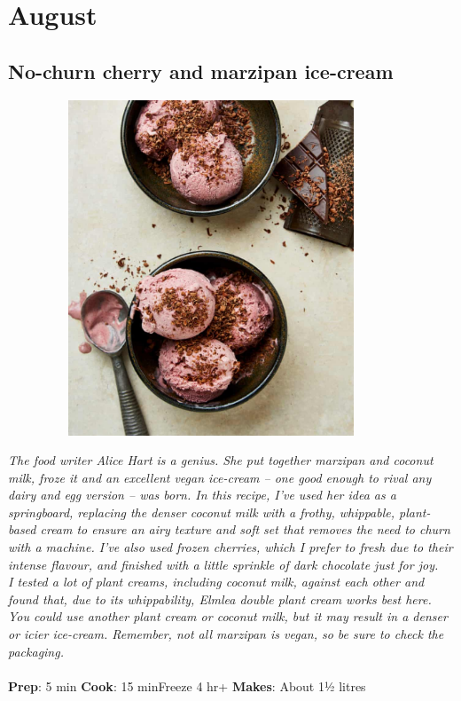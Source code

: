 \documentclass{book}
\begin{document}
\chapter{August}
\section{No-churn cherry and marzipan ice-cream}
\begin{figure}
\centering\includegraphics[width=10cm,height=10cm,keepaspectratio]{Recipe_Pictures/No-churn_cherry_and_marzipan_ice-cream.png}
\end{figure}
\emph{The food writer Alice Hart is a genius. She put together marzipan and coconut milk, froze it and an excellent vegan ice-cream – one good enough to rival any dairy and egg version – was born. In this recipe, I’ve used her idea as a springboard, replacing the denser coconut milk with a frothy, whippable, plant-based cream to ensure an airy texture and soft set that removes the need to churn with a machine. I’ve also used frozen cherries, which I prefer to fresh due to their intense flavour, and finished with a little sprinkle of dark chocolate just for joy.\\ 
I tested a lot of plant creams, including coconut milk, against each other and found that, due to its whippability, Elmlea double plant cream works best here. You could use another plant cream or coconut milk, but it may result in a denser or icier ice-cream. Remember, not all marzipan is vegan, so be sure to check the packaging.}\\\\ 
\textbf{Prep}: 5 min
\textbf{Cook}: 15 minFreeze 4 hr+
\textbf{Makes}: About 1½ litres
\end{document}
